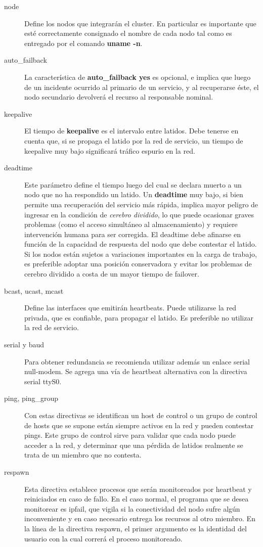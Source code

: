 \begin{description}
	\item[node] Define los nodos que integrarán el cluster. En particular es importante que esté correctamente consignado el nombre de cada nodo tal como es entregado por el comando \textbf{uname -n}.

	\item[auto\_failback] La característica de \textbf{auto\_failback yes} es opcional, e implica que luego de un incidente ocurrido al primario de un servicio, y al recuperarse éste, el nodo secundario devolverá el recurso al responsable nominal.

	\item[keepalive] El tiempo de \textbf{keepalive} es el intervalo entre latidos. Debe tenerse en cuenta que, si se propaga el latido por la red de servicio, un tiempo de keepalive muy bajo significará tráfico espurio en la red. 

	\item[deadtime] Este parámetro define el tiempo luego del cual se declara muerto a un nodo que no ha respondido un latido. Un \textbf{deadtime} muy bajo, si bien permite una recuperación del servicio más rápida, implica mayor peligro de ingresar en la condición de \textit{cerebro dividido}, lo que puede ocasionar graves problemas (como el acceso simultáneo al almacenamiento) y requiere intervención humana para ser corregida. El deadtime debe afinarse en función de la capacidad de respuesta del nodo que debe contestar el latido. Si los nodos están sujetos a variaciones importantes en la carga de trabajo, es preferible adoptar una posición conservadora y evitar los problemas de cerebro dividido a costa de un mayor tiempo de failover.

	 
	\item[bcast, ucast, mcast] Define las interfaces que emitirán heartbeats. Puede utilizarse la red privada, que es confiable, para propagar el latido. Es preferible no utilizar la red de servicio. 


	\item[serial y baud] Para obtener redundancia se recomienda utilizar además un enlace serial null-modem. Se agrega una vía de heartbeat alternativa con la directiva serial ttyS0.	

	\item[ping, ping\_group] Con estas directivas se identifican un host de control o un grupo de control de hosts que se supone están siempre activos en la red y pueden contestar pings. Este grupo de control sirve para validar que cada nodo puede acceder a la red, y determinar que una pérdida de latidos realmente se trata de un miembro que no contesta.

	\item[respawn] Esta directiva establece procesos que serán monitoreados por heartbeat y reiniciados en caso de fallo. En el caso normal, el programa que se desea monitorear es ipfail, que vigila si la conectividad del nodo sufre algún inconveniente y en caso necesario entrega los recursos al otro miembro. En la línea de la directiva respawn, el primer argumento es la identidad del usuario con la cual correrá el proceso monitoreado.
\end{description}
